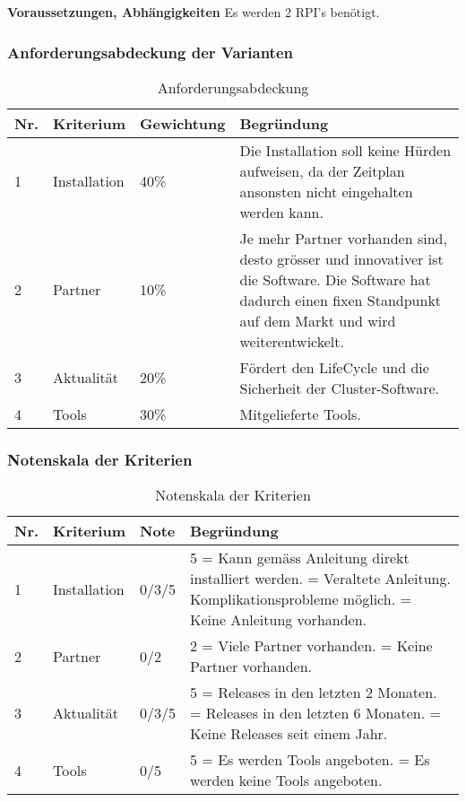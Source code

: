 \textbf{Voraussetzungen, Abhängigkeiten}\newline
Es werden 2 RPI's benötigt.

\subsubsection{Anforderungsabdeckung der Varianten}

\begin{table}[H]
\centering
\begin{tabular}{p{1cm}p{2.5cm}p{2.2cm}p{10.3cm}}
\hline
\rowcolor{heading} \textbf{Nr.} & \textbf{Kriterium} & \textbf{Gewichtung} &\textbf{Begründung} \\\hline
1 & Installation & 40\% & Die Installation soll keine Hürden aufweisen, da der Zeitplan ansonsten nicht eingehalten werden kann. \\\hline
2 & Partner & 10\% & Je mehr Partner vorhanden sind, desto grösser und innovativer ist die Software. Die Software hat dadurch einen fixen Standpunkt auf dem Markt und wird weiterentwickelt. \\\hline
3 & Aktualität & 20\% & Fördert den LifeCycle und die Sicherheit der Cluster-Software. \\\hline
4 & Tools & 30\% & Mitgelieferte Tools. \\\hline
\end{tabular}
\caption{Anforderungsabdeckung}
\end{table}

\subsubsection{Notenskala der Kriterien}
\begin{table}[H]
\centering
\begin{tabular}{p{0.6cm}p{2.2cm}p{}p{12.2cm}}
\hline
\rowcolor{heading} \textbf{Nr.} & \textbf{Kriterium} & \textbf{Note} &\textbf{Begründung} \\\hline
1 & Installation & 0/3/5 & 5 = Kann gemäss Anleitung direkt installiert werden. \newline 3 = Veraltete Anleitung. Komplikationsprobleme möglich. \newline
0 = Keine Anleitung vorhanden.
 \\\hline
2 & Partner & 0/2 & 2 = Viele Partner vorhanden. \newline
0 = Keine Partner vorhanden. \\\hline
3 & Aktualität & 0/3/5 & 5 = Releases in den letzten 2 Monaten. \newline 3 = Releases in den letzten 6 Monaten. \newline 0 = Keine Releases seit einem Jahr. \\\hline
4 & Tools & 0/5 & 5 = Es werden Tools angeboten. \newline 0 = Es werden keine Tools angeboten. \\\hline
\end{tabular}
\caption{Notenskala der Kriterien}
\end{table}

